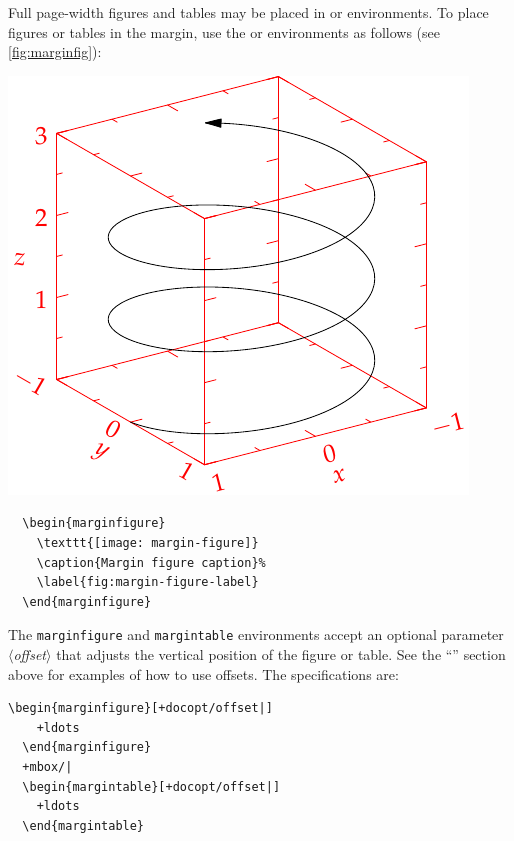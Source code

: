 \documentclass[a4paper]{tufte-handout}
\newcommand{\hlorange}[1]{\textcolor{tufte-orange}{#1}}
\newcommand{\docopt}[1]{\( \langle \)\textrm{\textit{#1}}\( \rangle \)}
\newcommand{\docenv}[1]{\hlorange{\texttt{#1}}}
\begin{document}
Full page-width figures and tables may be placed in  or  environments.
To place figures or tables in the margin, use the  or  environments as follows (see \cref{fig:marginfig}):
\begin{marginfigure}%
  \includegraphics[width=\linewidth]{helix}
  \caption[This is an example of a margin figure]{%
    This is a margin figure. 
    The helix is defined by \(x = \cos(2\pi z)\), \(y = \sin(2\pi z)\), and \(z = [0, 2.7]\). 
    The figure was drawn using \href{http://asymptote.sf.net/}{Asymptote} (\url{http://asymptote.sf.net/}).
  }\label{fig:marginfig}
\end{marginfigure}
\noindent
\begin{Verbatim}
  \begin{marginfigure}
    \texttt{[image: margin-figure]}
    \caption{Margin figure caption}%
    \label{fig:margin-figure-label}
  \end{marginfigure}
\end{Verbatim}

The \docenv{marginfigure} and \docenv{margintable} environments accept an optional parameter \docopt{offset} that adjusts the vertical position of the figure or table. 
See the ``'' section above for examples of how to use offsets.
The specifications are:
\noindent
\begin{Verbatim}[commandchars=+/|]
  \begin{marginfigure}[+docopt/offset|]
    +ldots
  \end{marginfigure}
  +mbox/|
  \begin{margintable}[+docopt/offset|]
    +ldots
  \end{margintable}
\end{Verbatim}
\end{document}

